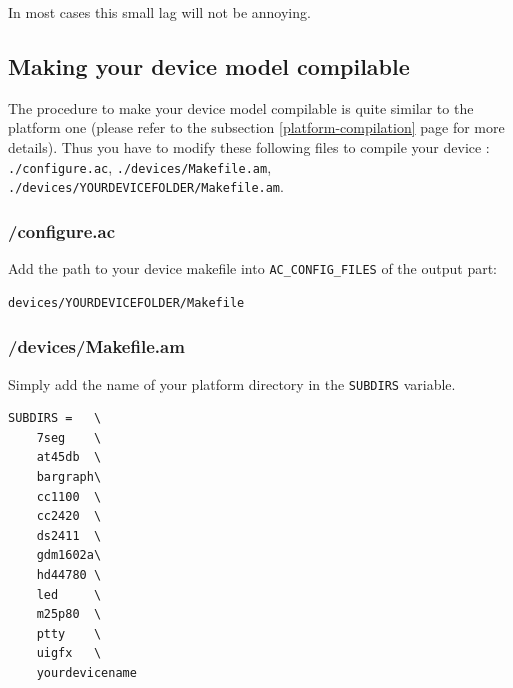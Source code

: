 \documentclass[a4paper,10pt]{report}
\begin{document}
In most cases this small lag will not be annoying.


\subsection{Making your device model compilable}
The procedure to make your device model compilable is quite similar to the platform one (please refer to the subsection \ref{platform-compilation} page \pageref{platform-compilation} for more details). Thus you have to modify these following files to compile your device : \verb$./configure.ac$, \verb$./devices/Makefile.am$, \verb$./devices/YOURDEVICEFOLDER/Makefile.am$.

\subsubsection{/configure.ac}
Add the path to your device makefile into \verb$AC_CONFIG_FILES$ of the output part: 
\begin{verbatim}
devices/YOURDEVICEFOLDER/Makefile
\end{verbatim}

\subsubsection{/devices/Makefile.am}
Simply add the name of your platform directory in the \verb$SUBDIRS$ variable.
\begin{verbatim}
SUBDIRS =   \
    7seg    \
    at45db  \
    bargraph\
    cc1100  \
    cc2420  \
    ds2411  \
    gdm1602a\
    hd44780 \
    led     \
    m25p80  \
    ptty    \
    uigfx   \
    yourdevicename
\end{verbatim}
\end{document}
